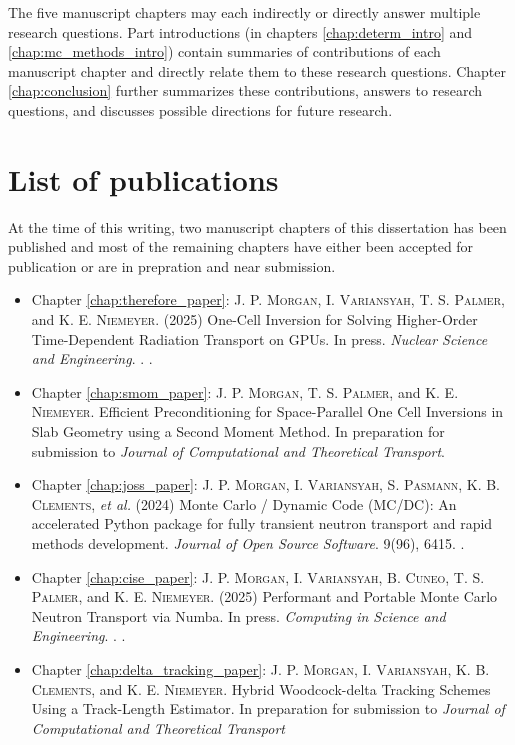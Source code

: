The five manuscript chapters may each indirectly or directly answer multiple research questions.
Part introductions (in chapters \ref{chap:determ_intro} and \ref{chap:mc_methods_intro}) contain summaries of contributions of each manuscript chapter and directly relate them to these research questions.
Chapter \ref{chap:conclusion} further summarizes these contributions, answers to research questions, and discusses possible directions for future research.

\section{List of publications}

At the time of this writing, two manuscript chapters of this dissertation has been published and most of the remaining chapters have either been accepted for publication or are in prepration and near submission.
\begin{itemize}
    \item Chapter \ref{chap:therefore_paper}: \textsc{J. P. Morgan}, \textsc{I. Variansyah}, \textsc{T. S. Palmer}, and \textsc{K. E. Niemeyer}. (2025) One-Cell Inversion for Solving Higher-Order Time-Dependent Radiation Transport on GPUs. In press. \emph{Nuclear Science and Engineering}. . .

    \item Chapter \ref{chap:smom_paper}: \textsc{J. P. Morgan},  \textsc{T. S. Palmer}, and \textsc{K. E. Niemeyer}. Efficient Preconditioning for Space-Parallel One Cell Inversions in Slab Geometry using a Second Moment Method. In preparation for submission to \emph{Journal of Computational and Theoretical Transport}.

    \item Chapter \ref{chap:joss_paper}: \textsc{J. P. Morgan}, \textsc{I. Variansyah}, \textsc{S. Pasmann}, \textsc{K. B. Clements}, \textit{et al.} (2024) Monte Carlo / Dynamic Code (MC/DC): An accelerated Python package for fully transient neutron transport and rapid methods development. \emph{Journal of Open Source Software}. 9(96), 6415. .

    \item Chapter \ref{chap:cise_paper}: \textsc{J. P. Morgan}, \textsc{I. Variansyah}, \textsc{B. Cuneo}, \textsc{T. S. Palmer}, and \textsc{K. E. Niemeyer}. (2025) Performant and Portable Monte Carlo Neutron Transport via Numba. In press. \emph{Computing in Science and Engineering}. . .

    \item Chapter \ref{chap:delta_tracking_paper}: \textsc{J. P. Morgan}, \textsc{I. Variansyah}, \textsc{K. B. Clements}, and \textsc{K. E. Niemeyer}. Hybrid Woodcock-delta Tracking Schemes Using a Track-Length Estimator. In preparation for submission to \emph{Journal of Computational and Theoretical Transport}
    
\end{itemize}

